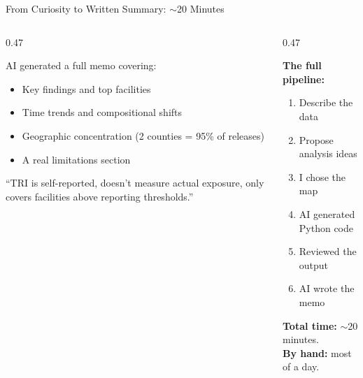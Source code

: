 \documentclass[aspectratio=169, 10pt]{beamer}
\begin{document}
\begin{frame}{From Curiosity to Written Summary: $\sim$20 Minutes}
\begin{columns}[T]
\begin{column}{0.47\textwidth}
\begin{tcolorbox}[keybox, title={\faFile*[regular]\quad The Summary Memo}]
\small
AI generated a full memo covering:
\begin{itemize}\setlength{\itemsep}{2pt}
  \item Key findings and top facilities
  \item Time trends and compositional shifts
  \item Geographic concentration (2 counties = 95\% of releases)
  \item A real limitations section
\end{itemize}
\vskip2pt
{\scriptsize\color{CoolGray} ``TRI is self-reported, doesn't measure actual exposure, only covers facilities above reporting thresholds.''}
\end{tcolorbox}
\end{column}
\begin{column}{0.47\textwidth}
\begin{tcolorbox}[accentbox]
\small
\textbf{The full pipeline:}
\vskip2pt
\begin{enumerate}\setlength{\itemsep}{1pt}
  \item Describe the data
  \item Propose analysis ideas
  \item I chose the map
  \item AI generated Python code
  \item Reviewed the output
  \item AI wrote the memo
\end{enumerate}
\vskip4pt
\textbf{Total time:} $\sim$20 minutes.\\
\textbf{By hand:} most of a day.
\end{tcolorbox}
\end{column}
\end{columns}
\end{frame}
\end{document}
